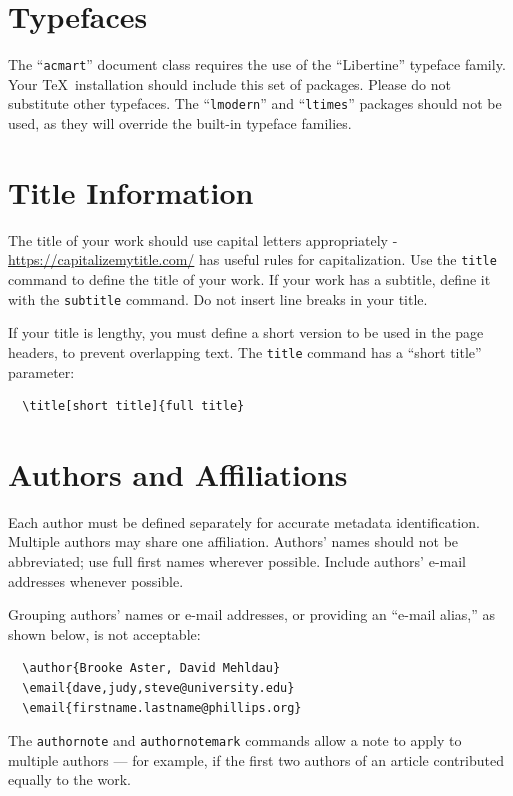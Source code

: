 \documentclass[manuscript,screen]{acmart}
\begin{document}
\section{Typefaces}

The ``\verb|acmart|'' document class requires the use of the
``Libertine'' typeface family. Your \TeX\ installation should include
this set of packages. Please do not substitute other typefaces. The
``\verb|lmodern|'' and ``\verb|ltimes|'' packages should not be used,
as they will override the built-in typeface families.

\section{Title Information}

The title of your work should use capital letters appropriately -
\url{https://capitalizemytitle.com/} has useful rules for
capitalization. Use the {\verb|title|} command to define the title of
your work. If your work has a subtitle, define it with the
{\verb|subtitle|} command.  Do not insert line breaks in your title.

If your title is lengthy, you must define a short version to be used
in the page headers, to prevent overlapping text. The \verb|title|
command has a ``short title'' parameter:
\begin{verbatim}
  \title[short title]{full title}
\end{verbatim}

\section{Authors and Affiliations}

Each author must be defined separately for accurate metadata
identification. Multiple authors may share one affiliation. Authors'
names should not be abbreviated; use full first names wherever
possible. Include authors' e-mail addresses whenever possible.

Grouping authors' names or e-mail addresses, or providing an ``e-mail
alias,'' as shown below, is not acceptable:
\begin{verbatim}
  \author{Brooke Aster, David Mehldau}
  \email{dave,judy,steve@university.edu}
  \email{firstname.lastname@phillips.org}
\end{verbatim}

The \verb|authornote| and \verb|authornotemark| commands allow a note
to apply to multiple authors --- for example, if the first two authors
of an article contributed equally to the work.
\end{document}
